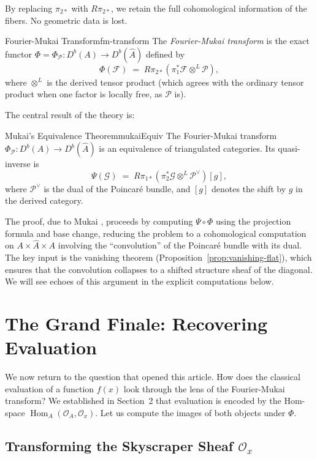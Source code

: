 \documentclass{article}
\newcommand{\CF}{{\mathcal{F}}}
\newcommand{\CG}{{\mathcal{G}}}
\newcommand{\CO}{{\mathcal{O}}}
\newcommand{\CP}{{\mathcal{P}}}
\newcommand{\Hom}{{\operatorname{Hom}}}
\begin{document}
By replacing $\pi_{2*}$ with $R\pi_{2*}$, we retain the full cohomological information of the fibers. No geometric data is lost.

\begin{defn}{Fourier-Mukai Transform}{fm-transform}
The \emph{Fourier-Mukai transform} is the exact functor $\Phi = \Phi_\CP\colon D^b(A) \to D^b(\hat{A})$ defined by
\[
    \Phi(\CF) \;=\; R\pi_{2*}(\pi_1^* \CF \otimes^L \CP),
\]
where $\otimes^L$ is the derived tensor product (which agrees with the ordinary tensor product when one factor is locally free, as $\CP$ is).
\end{defn}

The central result of the theory is:

\begin{thm}{Mukai's Equivalence Theorem}{mukaiEquiv}
The Fourier-Mukai transform $\Phi_\CP\colon D^b(A) \to D^b(\hat{A})$ is an equivalence of triangulated categories. Its quasi-inverse is
\[
    \Psi(\CG) \;=\; R\pi_{1*}(\pi_2^* \CG \otimes^L \CP^\vee) [g],
\]
where $\CP^\vee$ is the dual of the Poincar\'{e} bundle, and $[g]$ denotes the shift by $g$ in the derived category.
\end{thm}

The proof, due to Mukai \cite{mukai}, proceeds by computing $\Psi \circ \Phi$ using the projection formula and base change, reducing the problem to a cohomological computation on $A \times \hat{A} \times A$ involving the ``convolution'' of the Poincar\'{e} bundle with its dual. The key input is the vanishing theorem (Proposition~\ref{prop:vanishing-flat}), which ensures that the convolution collapses to a shifted structure sheaf of the diagonal. We will see echoes of this argument in the explicit computations below.


\section{The Grand Finale: Recovering Evaluation}

We now return to the question that opened this article. How does the classical evaluation of a function $f(x)$ look through the lens of the Fourier-Mukai transform? We established in Section~2 that evaluation is encoded by the Hom-space $\Hom_A(\CO_A, \CO_x)$. Let us compute the images of both objects under $\Phi$.

\subsection{Transforming the Skyscraper Sheaf $\CO_x$}
\end{document}
